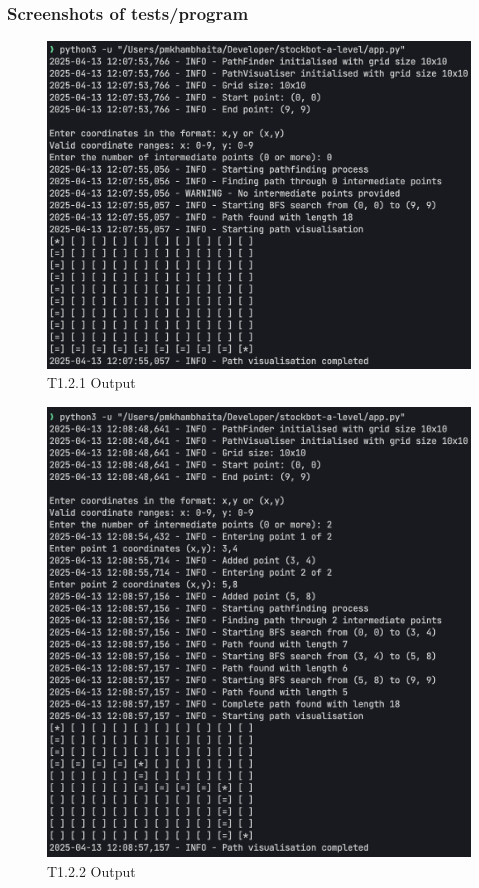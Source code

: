 \newpage

\subsubsection{Screenshots of tests/program}

\begin{figure}[htbp!]
    \centering
    \includegraphics[width=1\linewidth]{Images/t1.2.1.png}
    \caption{T1.2.1 Output}
    \label{fig:enter-label}
\end{figure}

\begin{figure}[htbp!]
    \centering
    \includegraphics[width=1\linewidth]{Images/t1.2.2.png}
    \caption{T1.2.2 Output}
    \label{fig:enter-label}
\end{figure}


